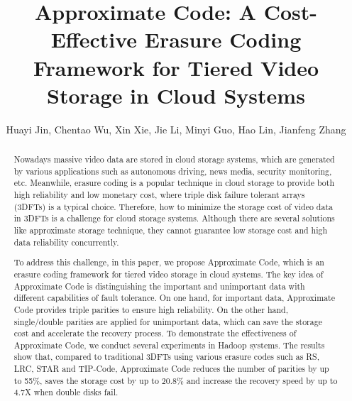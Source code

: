 \documentclass[sigconf]{acmart}
\begin{document}
\title{Approximate Code: A Cost-Effective Erasure Coding Framework for Tiered Video Storage in Cloud Systems}

\author{Huayi Jin, Chentao Wu, Xin Xie, Jie Li, Minyi Guo, Hao Lin, Jianfeng Zhang}

\begin{abstract}
Nowadays massive video data are stored in cloud storage systems, which are generated by various applications such as autonomous driving, news media, security monitoring, etc. Meanwhile, erasure coding is a popular technique in cloud storage to provide both high reliability and low monetary cost, where triple disk failure tolerant arrays (3DFTs) is a typical choice. Therefore, how to minimize the storage cost of video data in 3DFTs is a challenge for cloud storage systems. Although there are several solutions like approximate storage technique, they cannot guarantee low storage cost and high data reliability concurrently.

To address this challenge, in this paper, we propose Approximate Code, which is an erasure coding framework for tiered video storage in cloud systems. The key idea of Approximate Code is distinguishing the important and unimportant data with different capabilities of fault tolerance. On one hand, for important data, Approximate Code provides triple parities to ensure high reliability. On the other hand, single/double parities are applied for unimportant data, which can save the storage cost and accelerate the recovery process. To demonstrate the effectiveness of Approximate Code, we conduct several experiments in Hadoop systems. The results show that, compared to traditional 3DFTs using various erasure codes such as RS, LRC, STAR and TIP-Code, Approximate Code reduces the number of parities by up to 55\%, saves the storage cost by up to 20.8\% and increase the recovery speed by up to 4.7X when double disks fail.
\end{abstract}


\maketitle
\end{document}
